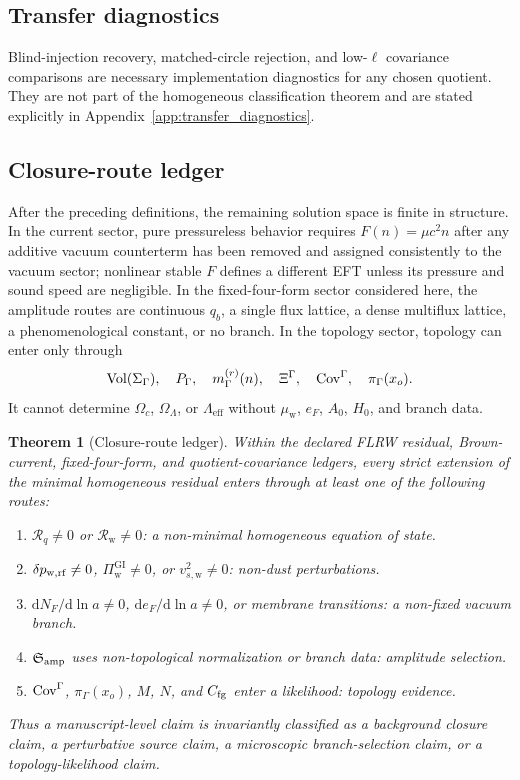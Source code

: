 \documentclass[
  aps,
  prd,
  reprint,
  superscriptaddress,
  floatfix,
  nofootinbib,
  longbibliography
]{revtex4-2}
\theoremstyle{plain}
\newtheorem{theorem}{Theorem}
\theoremstyle{definition}
\theoremstyle{remark}
\newcommand{\dd}{\mathrm d}
\newcommand{\wind}{\mathrm w}
\newcommand{\eff}{\mathrm{eff}}
\newcommand{\GI}{\mathrm{GI}}
\newcommand{\Rcl}{\mathcal R}
\DeclareMathOperator{\Vol}{Vol}
\newcommand{\NF}{N_F}
\newcommand{\eF}{e_F}
\newcommand{\PG}{P_\Gamma}
\begin{document}
\subsection{Transfer diagnostics}
Blind-injection recovery, matched-circle rejection, and low-\(\ell\) covariance comparisons are necessary implementation diagnostics for any chosen quotient.  They are not part of the homogeneous classification theorem and are stated explicitly in Appendix~\ref{app:transfer_diagnostics}.

\subsection{Closure-route ledger}

After the preceding definitions, the remaining solution space is finite in
structure.  In the current sector, pure pressureless behavior requires
$F(n)=\mu c^2n$ after any additive vacuum counterterm has been removed and
assigned consistently to the vacuum sector; nonlinear stable $F$ defines a
different EFT unless its pressure and sound speed are negligible.  In the
fixed-four-form sector considered here,
the amplitude routes are continuous $q_b$, a single flux lattice, a dense
multiflux lattice, a phenomenological constant, or no branch.  In the topology
sector, topology can enter only through
\begin{equation}
\Vol(\Sigma_\Gamma),\quad
\PG,
\quad m_\Gamma^{(r)}(n),
\quad \Xi^\Gamma,
\quad {\rm Cov}^\Gamma,
\quad \pi_\Gamma(x_o) .
\end{equation}
It cannot determine $\Omega_c$, $\Omega_\Lambda$, or $\Lambda_{\eff}$ without
$\mu_{\wind}$, $\eF$, $A_0$, $H_0$, and branch data.

\begin{theorem}[Closure-route ledger]
Within the declared FLRW residual, Brown-current, fixed-four-form, and
quotient-covariance ledgers, every strict extension of the minimal homogeneous
residual enters through at least one of the following routes:
\begin{enumerate}
\item \(\Rcl_q\ne0\) or \(\Rcl_{\wind}\ne0\):
a non-minimal homogeneous equation of state.
\item \(\delta p_{\wind,{\rm rf}}\ne0\), \(\Pi_{\wind}^{\GI}\ne0\), or
\(v_{s,\wind}^2\ne0\): non-dust perturbations.
\item \(\dd \NF/\dd\ln a\ne0\), \(\dd \eF/\dd\ln a\ne0\), or membrane
transitions: a non-fixed vacuum branch.
\item \(\mathfrak S_{\rm amp}\) uses non-topological normalization or branch
data: amplitude selection.
\item \({\rm Cov}^\Gamma\), \(\pi_\Gamma(x_o)\), \(M\), \(N\), and
\(C_{\rm fg}\) enter a likelihood: topology evidence.
\end{enumerate}
Thus a manuscript-level claim is invariantly classified as a background closure
claim, a perturbative source claim, a microscopic branch-selection claim, or a
topology-likelihood claim.
\end{theorem}
\end{document}
